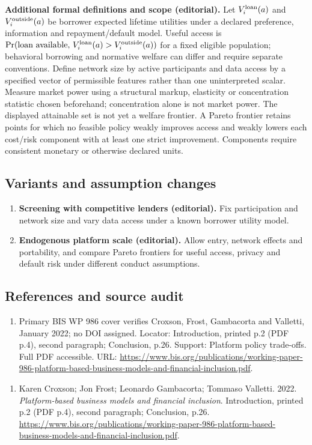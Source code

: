 \documentclass[11pt,a4paper]{article}
\begin{document}
\textbf{Additional formal definitions and scope (editorial).} Let \(V_i^{\rm loan}(a)\) and \(V_i^{\rm outside}(a)\) be borrower expected lifetime utilities under a declared preference, information and repayment/default model. Useful access is \(\Pr(\text{loan available},\,V_i^{\rm loan}(a)>V_i^{\rm outside}(a))\) for a fixed eligible population; behavioral borrowing and normative welfare can differ and require separate conventions. Define network size by active participants and data access by a specified vector of permissible features rather than one uninterpreted scalar. Measure market power using a structural markup, elasticity or concentration statistic chosen beforehand; concentration alone is not market power. The displayed attainable set is not yet a welfare frontier. A Pareto frontier retains points for which no feasible policy weakly improves access and weakly lowers each cost/risk component with at least one strict improvement. Components require consistent monetary or otherwise declared units.
\subsection*{Variants and assumption changes}
\begin{enumerate}
\item \textbf{Screening with competitive lenders (editorial).} Fix participation and network size and vary data access under a known borrower utility model.
\item \textbf{Endogenous platform scale (editorial).} Allow entry, network effects and portability, and compare Pareto frontiers for useful access, privacy and default risk under different conduct assumptions.
\end{enumerate}
\subsection*{References and source audit}
\begin{enumerate}
\item Primary BIS WP 986 cover verifies Croxson, Frost, Gambacorta and Valletti, January 2022; no DOI assigned. Locator: Introduction, printed p.2 (PDF p.4), second paragraph; Conclusion, p.26. Support: Platform policy trade-offs. Full PDF accessible. URL: \url{https://www.bis.org/publications/working-paper-986-platform-based-business-models-and-financial-inclusion.pdf}.
\end{enumerate}
\begin{enumerate}\raggedright
\item\hypertarget{definitions:source:30007610:1}{} Karen Croxson; Jon Frost; Leonardo Gambacorta; Tommaso Valletti. 2022. \emph{Platform-based business models and financial inclusion}. Introduction, printed p.2 (PDF p.4), second paragraph; Conclusion, p.26.
\url{https://www.bis.org/publications/working-paper-986-platform-based-business-models-and-financial-inclusion.pdf}.
\end{enumerate}
\end{document}
